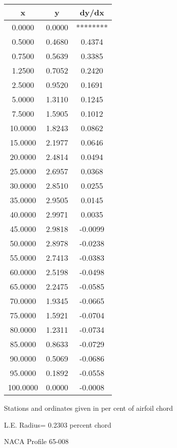 \documentclass[11pt]{book}
\begin{document}
 \vspace{8mm}
 \begin{tabular}{|c|c|c|} \hline 
  x  &  y  &  dy/dx \\
 \hline
0.0000 & 0.0000 & ******** \\
0.5000 & 0.4680 & 0.4374 \\
0.7500 & 0.5639 & 0.3385 \\
1.2500 & 0.7052 & 0.2420 \\
2.5000 & 0.9520 & 0.1691 \\
5.0000 & 1.3110 & 0.1245 \\
7.5000 & 1.5905 & 0.1012 \\
10.0000 & 1.8243 & 0.0862 \\
15.0000 & 2.1977 & 0.0646 \\
20.0000 & 2.4814 & 0.0494 \\
25.0000 & 2.6957 & 0.0368 \\
30.0000 & 2.8510 & 0.0255 \\
35.0000 & 2.9505 & 0.0145 \\
40.0000 & 2.9971 & 0.0035 \\
45.0000 & 2.9818 & -0.0099 \\
50.0000 & 2.8978 & -0.0238 \\
55.0000 & 2.7413 & -0.0383 \\
60.0000 & 2.5198 & -0.0498 \\
65.0000 & 2.2475 & -0.0585 \\
70.0000 & 1.9345 & -0.0665 \\
75.0000 & 1.5921 & -0.0704 \\
80.0000 & 1.2311 & -0.0734 \\
85.0000 & 0.8633 & -0.0729 \\
90.0000 & 0.5069 & -0.0686 \\
95.0000 & 0.1892 & -0.0558 \\
100.0000 & 0.0000 & -0.0008 \\
 \hline
 \end{tabular}
 \vspace{8mm}


Stations and ordinates given in per cent of airfoil chord 


L.E. Radius=  0.2303 percent chord
 \newpage
  \label{p65-008}
 \begin{Large}
 NACA Profile 65-008
 \end{Large}
  
\end{document}
